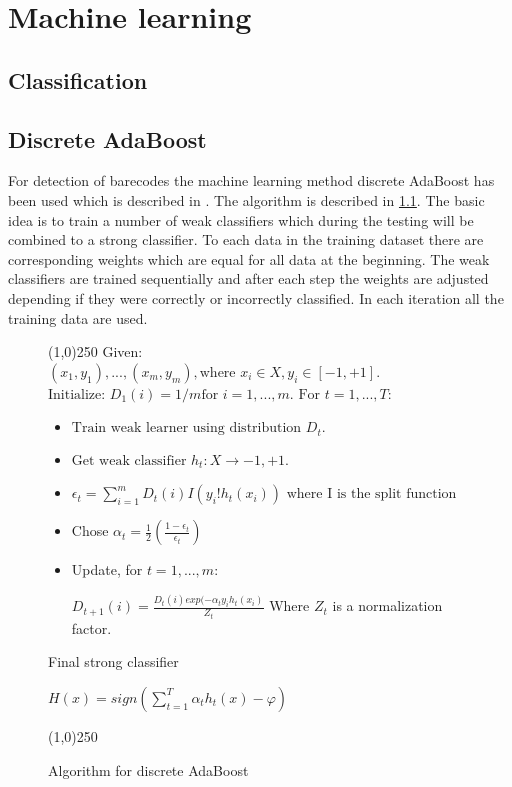 \chapter{Machine learning}
\label{sec:Machine learning}

\section{Classification}
\label{classification}
\section{Discrete AdaBoost}
\label{sec:Discret AdaBoost}
For detection of barecodes the machine learning method discrete AdaBoost has been used which is described in \citep{Friedman:2000}. The algorithm is described in \ref{AdaBoost}. The basic idea is to train a number of weak classifiers which during the testing will be combined to a strong classifier. To each data in the training dataset there are corresponding weights which are equal for all data at the beginning. The weak classifiers are trained sequentially and after each step the weights are adjusted depending if they were correctly or incorrectly classified. In each iteration all the training data are used.

\begin{figure} [H]
\line(1,0){250} \newline
Given: $(x_1,y_1),...,(x_m,y_m), \text{where } x_i\in X, y_i \in [-1,+1]$. \newline
$\text{Initialize: } D_1(i)=1/m \text{for } i=1,...,m.$ \newline \newline
$\text{For } t=1,...,T:$
\begin{itemize}
\item $\text{Train weak learner using distribution } D_t.$
\item $\text{Get weak classifier } h_t : X \to {-1,+1}$.
\item {}
\begin{center} 

	$\epsilon_t = \sum_{i=1}^{m} D_t(i)I(y_i ! h_t(x_i))$ \newline
	$\text{where I is the split function}$ \newline
\end{center}
\item Chose $ \alpha_t = \frac{1}{2}(\frac{1-\epsilon_t}{\epsilon_t})$
\item Update, for $t = 1,...,m:$
\begin{center} 

	$D_{t+1}(i) = \frac{D_t(i)exp(-\alpha_ty_ih_t(x_i)}{Z_t}$ \newline
	Where $Z_t$ is a normalization factor. \newline
\end{center}
\end{itemize}
Final strong classifier
\begin{center}
	$ H(x) = sign(\sum_{t=1}^{T} {\alpha_th_t(x)}-\varphi)$
\end{center}
\line(1,0){250}
\caption{Algorithm for discrete AdaBoost}
\label{AdaBoost}
\end{figure}


